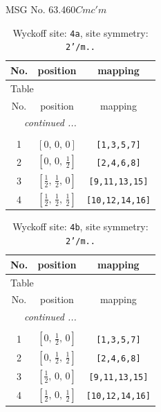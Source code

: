 \documentclass[fleqn,8pt]{jsarticle}
\begin{document}
\setcounter{MaxMatrixCols}{32}

\renewcommand{\tablename}{Table~}
\renewcommand{\figurename}{Figure~}
\begin{center}
\LARGE
MSG No. 63.460\quad$Cmc'm$
\end{center}
\renewcommand{\arraystretch}{1.2}
\begin{longtable}{ccc}
\caption{Wyckoff site: {\tt 4a}, site symmetry: {\tt 2'/m..}}
 \\
 \hline \hline
No. & position & mapping \\ \hline \endfirsthead

\multicolumn{2}{l}{\tablename\ \thetable{}} \\
 \hline \hline
No. & position & mapping \\ \hline \endhead

 \hline \hline
\multicolumn{2}{r}{\footnotesize\it continued ...} \\ \endfoot

 \hline \hline
\multicolumn{2}{r}{} \\ \endlastfoot

1 & $\left[ 0,\, 0,\, 0 \right]$ & {\tt [1,3,5,7]} \\ \hline
2 & $\left[ 0,\, 0,\, \frac{1}{2} \right]$ & {\tt [2,4,6,8]} \\ \hline
3 & $\left[ \frac{1}{2},\, \frac{1}{2},\, 0 \right]$ & {\tt [9,11,13,15]} \\ \hline
4 & $\left[ \frac{1}{2},\, \frac{1}{2},\, \frac{1}{2} \right]$ & {\tt [10,12,14,16]} \\
\end{longtable}
\renewcommand{\arraystretch}{1.2}
\begin{longtable}{ccc}
\caption{Wyckoff site: {\tt 4b}, site symmetry: {\tt 2'/m..}}
 \\
 \hline \hline
No. & position & mapping \\ \hline \endfirsthead

\multicolumn{2}{l}{\tablename\ \thetable{}} \\
 \hline \hline
No. & position & mapping \\ \hline \endhead

 \hline \hline
\multicolumn{2}{r}{\footnotesize\it continued ...} \\ \endfoot

 \hline \hline
\multicolumn{2}{r}{} \\ \endlastfoot

1 & $\left[ 0,\, \frac{1}{2},\, 0 \right]$ & {\tt [1,3,5,7]} \\ \hline
2 & $\left[ 0,\, \frac{1}{2},\, \frac{1}{2} \right]$ & {\tt [2,4,6,8]} \\ \hline
3 & $\left[ \frac{1}{2},\, 0,\, 0 \right]$ & {\tt [9,11,13,15]} \\ \hline
4 & $\left[ \frac{1}{2},\, 0,\, \frac{1}{2} \right]$ & {\tt [10,12,14,16]} \\
\end{longtable}
\end{document}
